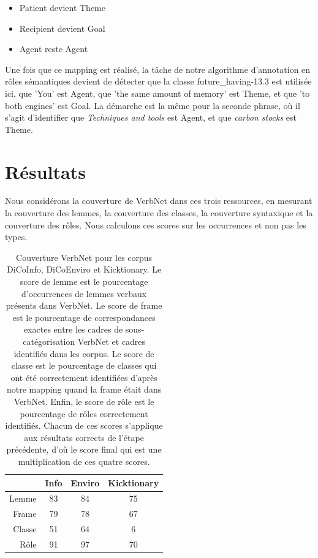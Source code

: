 \begin{itemize}
    \item Patient devient Theme
    \item Recipient devient Goal
    \item Agent reste Agent
\end{itemize}

Une fois que ce mapping est réalisé, la tâche de notre algorithme d'annotation
en rôles sémantiques devient de détecter que la classe future\_having-13.3 est
utilisée ici, que 'You' est Agent, que 'the same amount of memory' est Theme,
et que 'to both engines' est Goal. La démarche est la même pour la seconde
phrase, où il s'agit d'identifier que \textit{Techniques and tools} est Agent,
et que \textit{carbon stocks} est Theme.


\section{Résultats}
\label{sec:domainsrlresults}

Nous considérons la couverture de VerbNet dans ces trois ressources, en
mesurant la couverture des lemmes, la couverture des classes, la couverture
syntaxique et la couverture des rôles. Nous calculons ces scores sur les
occurrences et non pas les types.

\begin{table}[h]
\centering
\begin{tabular}{rccc}
  \toprule
         & Info & Enviro & Kicktionary \\
  \midrule
  Lemme  & 83 & 84 & 75 \\
  Frame  & 79 & 78 & 67 \\
  Classe & 51 & 64 & 6  \\
  Rôle   & 91 & 97 & 70 \\
  \bottomrule
\end{tabular}

\caption{\label{table:coverage} Couverture VerbNet pour les corpus DiCoInfo,
    DiCoEnviro et Kicktionary. Le score de lemme est le pourcentage
    d'occurrences de lemmes verbaux présents dans VerbNet. Le score de frame
    est le pourcentage de correspondances exactes entre les cadres de
    sous-catégorisation VerbNet et cadres identifiés dans les corpus. Le score
    de classe est le pourcentage de classes qui ont été correctement
    identifiées d'après notre mapping quand la frame était dans VerbNet. Enfin,
    le score de rôle est le pourcentage de rôles correctement identifiés.
    Chacun de ces scores s'applique aux résultats corrects de l'étape
    précédente, d'où le score final qui est une multiplication de ces quatre
    scores.}

\end{table}

